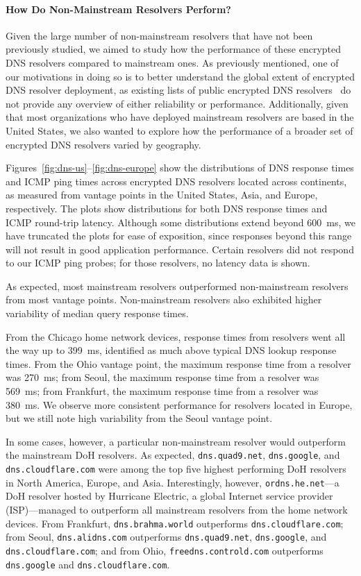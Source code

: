 \paragraph{How Do Non-Mainstream Resolvers Perform?}
Given the large number of non-mainstream resolvers that have not been
previously studied, we aimed to study how
the performance of these encrypted DNS resolvers compared to mainstream ones.
As previously mentioned, one of our motivations in doing so is to better
understand the global extent of encrypted DNS resolver deployment, as existing
lists of public encrypted DNS resolvers~\cite{dnscrypt-public-resolvers} do
not provide any overview of either reliability or performance. Additionally,
given that most organizations who have deployed mainstream resolvers are based
in the United States, we also wanted to explore how the performance of a
broader set of encrypted DNS resolvers varied by geography.

Figures~\ref{fig:dns-us}--\ref{fig:dns-europe} show the distributions of DNS
response times and ICMP ping times across encrypted DNS resolvers located across continents, as measured
from vantage points in the United States, Asia, and Europe, respectively. The
plots show distributions for both DNS response times and ICMP round-trip latency. 
Although some distributions extend beyond 600~ms, we have truncated the plots
for ease of exposition, since responses beyond this range will not result in
good application performance.
Certain resolvers did not respond to our ICMP ping probes; for those
resolvers, no latency data is shown.


As expected, most mainstream resolvers outperformed non-mainstream resolvers
from most vantage points.
Non-mainstream resolvers also exhibited higher variability of 
median query response times.  

From the Chicago home network devices, response times from resolvers went all the way up to 
399~ms, identified as much above typical DNS lookup response times.
From the Ohio vantage point, the maximum response time from a resolver was 270~ms; from Seoul,
the maximum response time from a resolver was 569~ms; from Frankfurt, the maximum response time from a resolver was 380~ms. 
We observe more consistent performance for resolvers located in Europe, but we still 
note high variability from the Seoul vantage point. 

In some cases, however, a particular non-mainstream resolver would outperform
the mainstream DoH resolvers.  As expected, \texttt{dns.quad9.net},
\texttt{dns.google}, and \texttt{dns.cloudflare.com} were among the top five
highest performing DoH resolvers in North America, Europe, and Asia.
Interestingly, however, \texttt{ordns.he.net}---a DoH resolver hosted by
Hurricane Electric, a global Internet service provider (ISP)---managed to
outperform all mainstream resolvers from the home network devices. From Frankfurt, \texttt{dns.brahma.world}
outperforms \texttt{dns.cloudflare.com}; from Seoul, \texttt{dns.alidns.com} outperforms \texttt{dns.quad9.net},
\texttt{dns.google}, and \texttt{dns.cloudflare.com}; and from Ohio, \texttt{freedns.controld.com} outperforms \texttt{dns.google}
and \texttt{dns.cloudflare.com}.

